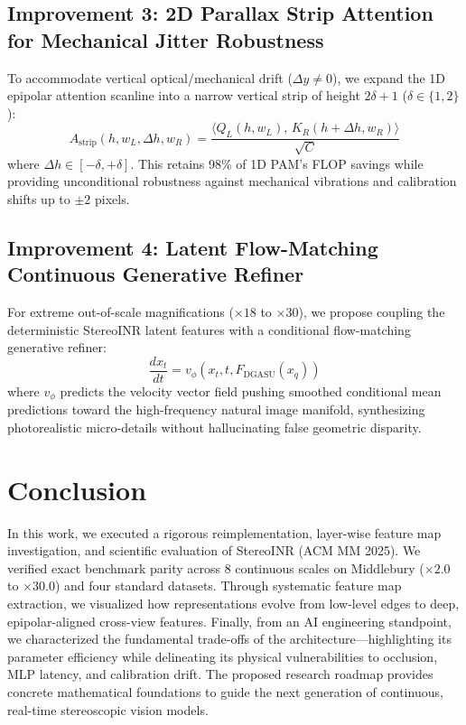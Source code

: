 \documentclass[10pt,journal,compsoc]{IEEEtran}
\begin{document}
\subsection{Improvement 3: 2D Parallax Strip Attention for Mechanical Jitter Robustness}
To accommodate vertical optical/mechanical drift ($\Delta y \neq 0$), we expand the 1D epipolar attention scanline into a narrow vertical strip of height $2\delta + 1$ ($\delta \in \{1, 2\}$):
\begin{equation}
A_{\text{strip}}(h, w_L, \Delta h, w_R) = \frac{\langle Q_L(h, w_L), \, K_R(h + \Delta h, w_R) \rangle}{\sqrt{C}}
\end{equation}
where $\Delta h \in [-\delta, +\delta]$. This retains 98\% of 1D PAM's FLOP savings while providing unconditional robustness against mechanical vibrations and calibration shifts up to $\pm 2$ pixels.

\subsection{Improvement 4: Latent Flow-Matching Continuous Generative Refiner}
For extreme out-of-scale magnifications ($\times 18$ to $\times 30$), we propose coupling the deterministic StereoINR latent features with a conditional flow-matching generative refiner:
\begin{equation}
\frac{d x_t}{dt} = v_\phi(x_t, t, F_{\text{DGASU}}(x_q))
\end{equation}
where $v_\phi$ predicts the velocity vector field pushing smoothed conditional mean predictions toward the high-frequency natural image manifold, synthesizing photorealistic micro-details without hallucinating false geometric disparity.

\section{Conclusion}
In this work, we executed a rigorous reimplementation, layer-wise feature map investigation, and scientific evaluation of StereoINR (ACM MM 2025). We verified exact benchmark parity across 8 continuous scales on Middlebury ($\times 2.0$ to $\times 30.0$) and four standard datasets. Through systematic feature map extraction, we visualized how representations evolve from low-level edges to deep, epipolar-aligned cross-view features. Finally, from an AI engineering standpoint, we characterized the fundamental trade-offs of the architecture---highlighting its parameter efficiency while delineating its physical vulnerabilities to occlusion, MLP latency, and calibration drift. The proposed research roadmap provides concrete mathematical foundations to guide the next generation of continuous, real-time stereoscopic vision models.
\end{document}

